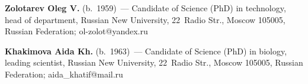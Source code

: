 \vspace*{2pt}

\noindent
\textbf{Zolotarev Oleg V.} (b.\ 1959)~--- Candidate of Science (PhD) in technology, head of department, 
Russian New University, 22~Radio Str., Moscow 105005, Russian Federation;  
\mbox{ol-zolot@yandex.ru}

\vspace*{2pt}

\noindent
\textbf{Khakimova Aida Kh.} (b.\ 1963)~--- Candidate of Science (PhD) in biology, leading scientist, 
Russian New University, 22~Radio Str., Moscow 105005, Russian Federation; 
\mbox{aida\_khatif@mail.ru}

 

\label{end\stat}

\renewcommand{\bibname}{\protect\rm Литература}    